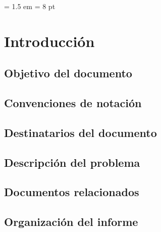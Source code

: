 \documentclass[a4paper, 10pt,titlepage]{article}
\author{Echevarría - Giusto - Farjat - Freijo }
\begin{document}
\parindent = 1.5 em 
\parskip = 8 pt %

\newcommand{\todo}{{\large\textbf{TODO: }}}
\newcommand{\paso}{\textsc{Paso }}
\newcommand{\func}[1]{\verb"#1"}
% 
%  



\tableofcontents


\section{Introducción}

    \subsection{ Objetivo del documento	}
    \subsection{ Convenciones de notación	}
    \subsection{ Destinatarios del documento	}
    \subsection{ Descripción del problema 	}
    \subsection{ Documentos relacionados	}
    \subsection{ Organización del informe	}
\end{document}
